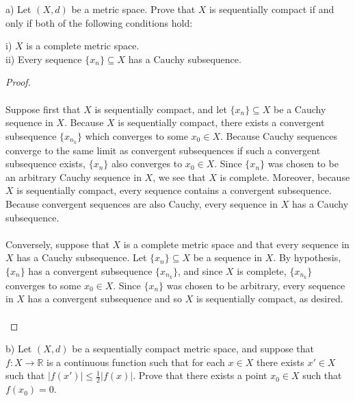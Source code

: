 a) Let $(X, d)$ be a metric space. Prove that $X$ is sequentially compact if and only if both of the following 
   conditions hold:

   i) $X$ is a complete metric space. \\
   ii) Every sequence $\{ x_n \} \subseteq X$ has a Cauchy subsequence.

\begin{proof}\ \\\\
   Suppose first that $X$ is sequentially compact, and let $\{x_n\} \subseteq X$ be a Cauchy sequence in $X$. Because
   $X$ is sequentially compact, there exists a convergent subsequence $\{x_{n_k}\}$ which converges to some $x_0 \in X$.
   Because Cauchy sequences converge to the same limit as convergent subsequences if such a convergent subsequence 
   exists, $\{x_n\}$ also converges to $x_0 \in X$. Since $\{x_n\}$ was chosen to be an arbitrary Cauchy sequence in 
   $X$, we see that $X$ is complete.
   Moreover, because $X$ is sequentially compact, every sequence contains a convergent subsequence. Because convergent
   sequences are also Cauchy, every sequence in $X$ has a Cauchy subsequence.
   \ \\\\
   Conversely, suppose that $X$ is a complete metric space and that every sequence in $X$ has a Cauchy
   subsequence. Let $\{ x_n \} \subseteq X$ be a sequence in $X$. By hypothesis, $\{ x_n \}$ has a convergent 
   subsequence $\{ x_{n_k} \}$, and since $X$ is complete, $\{ x_{n_k} \}$ converges to some $x_0 \in X$. Since 
   $\{ x_n \}$ was chosen to be arbitrary, every sequence in $X$ has a convergent subsequence and so $X$ is sequentially
   compact, as desired.
   \ \\
\end{proof}

\pagebreak


b) Let $(X, d)$ be a sequentially compact metric space, and suppose that $f:X \to \mathbb{R}$ is a continuous function
   such that for each $x \in X$ there exists $x' \in X$ such that $|f(x')| \le \frac{1}{2}|f(x)|$.  Prove that there 
   exists a point $x_0 \in X$ such that $f(x_0) = 0$.

